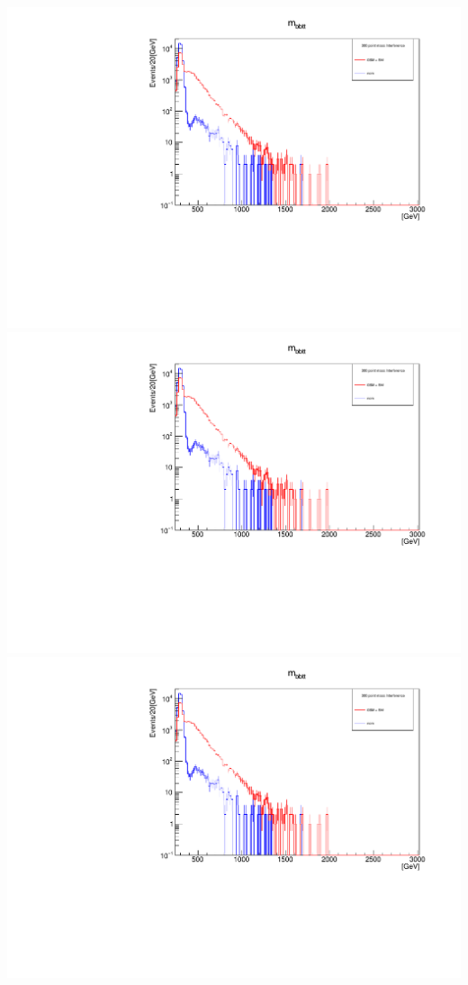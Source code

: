 \documentclass[a4wide,10pt]{article}
\begin{document}
\includegraphics[scale=0.50,page=1]{InterferencePlots03p.pdf}
\includegraphics[scale=0.50,page=2]{InterferencePlots03p.pdf}
\includegraphics[scale=0.50,page=3]{InterferencePlots03p.pdf}
\end{document}
